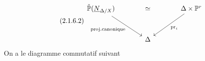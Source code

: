 \begin{equation}\tag{2.1.6.2}
\begin{tikzcd}[column sep=large, row sep=large]
\check{\mathbb{P}}(\underline{N}_{\Delta/X}) \arrow[rr, phantom, "\simeq"] \arrow[dr, "\text{proj.canonique}"'] & {} & \Delta \times \mathbb{P}^r \arrow[dl, "\mathrm{pr}_i"] \\
{} & \Delta &
{} \end{tikzcd}
\end{equation}
On a le diagramme commutatif suivant

